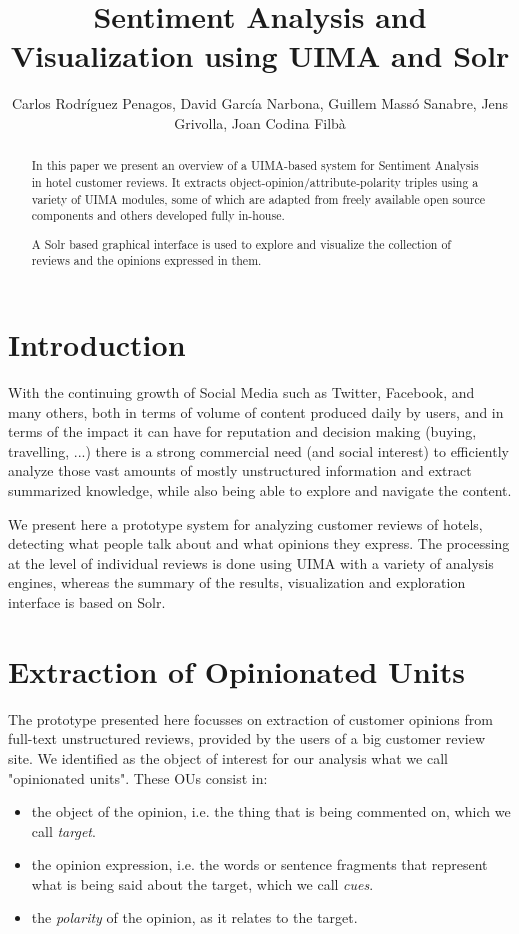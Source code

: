 \documentclass{llncs}
\title{Sentiment Analysis and Visualization using UIMA and Solr}
\author{Carlos Rodríguez Penagos, David García Narbona, Guillem Massó Sanabre, Jens Grivolla, Joan Codina Filbà}
\institute{Barcelona Media Innovation Centre}
\begin{document}
\maketitle

\begin{abstract}
In this paper we present an overview of a UIMA-based system for Sentiment Analysis in hotel customer reviews. It extracts object-opinion/attribute-polarity triples using a variety of UIMA modules, some of which are adapted from freely available open source components and others developed fully in-house.

A Solr based graphical interface is used to explore and visualize the collection of reviews and the opinions expressed in them.
\end{abstract}

\section{Introduction}

With the continuing growth of Social Media such as Twitter, Facebook, and many others, both in terms of volume of content produced daily by users, and in terms of the impact it can have for reputation and decision making (buying, travelling, ...) there is a strong commercial need (and social interest) to efficiently analyze those vast amounts of mostly unstructured information and extract summarized knowledge, while also being able to explore and navigate the content.

We present here a prototype system for analyzing customer reviews of hotels, detecting what people talk about and what opinions they express. The processing at the level of individual reviews is done using UIMA with a variety of analysis engines, whereas the summary of the results, visualization and exploration interface is based on Solr.

\section{Extraction of Opinionated Units}

The prototype presented here focusses on extraction of customer opinions from full-text unstructured reviews, provided by the users of a big customer review site. We identified as the object of interest for our analysis what we call "opinionated units". These OUs consist in:
\begin{itemize}
\item the object of the opinion, i.e. the thing that is being commented on, which we call \emph{target}.
\item the opinion expression, i.e. the words or sentence fragments that represent what is being said about the target, which we call \emph{cues}.
\item the \emph{polarity} of the opinion, as it relates to the target.
\end{itemize}
\end{document}
